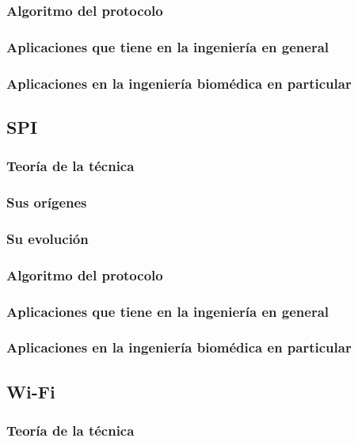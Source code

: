 \documentclass[conference]{IEEEtran}
\begin{document}
  \subsubsection{Algoritmo del protocolo}
  \subsubsection{Aplicaciones que tiene en la ingeniería en general}
  \subsubsection{Aplicaciones en la ingeniería biomédica en particular}


\subsection{SPI}
  \subsubsection{Teoría de la técnica}
  \subsubsection{Sus orígenes}
  \subsubsection{Su evolución}
  \subsubsection{Algoritmo del protocolo}
  \subsubsection{Aplicaciones que tiene en la ingeniería en general}
  \subsubsection{Aplicaciones en la ingeniería biomédica en particular}

\subsection{Wi-Fi}
  \subsubsection{Teoría de la técnica}
\end{document}
